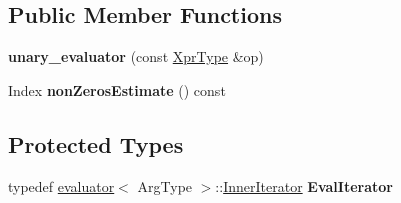 \subsection*{Public Member Functions}
\begin{DoxyCompactItemize}
\item 
\mbox{\label{struct_eigen_1_1internal_1_1unary__evaluator_3_01_block_3_01_arg_type_00_01_block_rows_00_01_blodb73497179e7c432f93b3052e2754983_a60f6106b40381d37c8bef793ac0b9bdb}} 
{\bfseries unary\+\_\+evaluator} (const \mbox{\hyperlink{class_eigen_1_1_block}{Xpr\+Type}} \&op)
\item 
\mbox{\label{struct_eigen_1_1internal_1_1unary__evaluator_3_01_block_3_01_arg_type_00_01_block_rows_00_01_blodb73497179e7c432f93b3052e2754983_a8ba2f6d99ab98b5955178cefa2c90e50}} 
Index {\bfseries non\+Zeros\+Estimate} () const
\end{DoxyCompactItemize}
\subsection*{Protected Types}
\begin{DoxyCompactItemize}
\item 
\mbox{\label{struct_eigen_1_1internal_1_1unary__evaluator_3_01_block_3_01_arg_type_00_01_block_rows_00_01_blodb73497179e7c432f93b3052e2754983_a4dbf4d167a0970ef1d83f5dd3d30f044}} 
typedef \mbox{\hyperlink{struct_eigen_1_1internal_1_1evaluator}{evaluator}}$<$ Arg\+Type $>$\+::\mbox{\hyperlink{struct_eigen_1_1internal_1_1true__type}{Inner\+Iterator}} {\bfseries Eval\+Iterator}
\end{DoxyCompactItemize}
